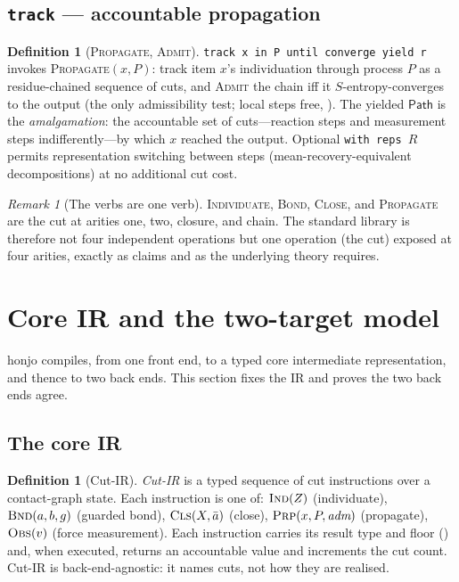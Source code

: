 \documentclass[11pt,a4paper]{article}
\theoremstyle{thmstyle}
\theoremstyle{definition}
\newtheorem{definition}[theorem]{Definition}
\theoremstyle{remark}
\newtheorem{remark}[theorem]{Remark}
\newcommand{\hj}[1]{\texttt{#1}}
\begin{document}
\subsection{\texorpdfstring{\hj{track} --- accountable propagation}{track --- accountable propagation}}
\label{sec:stdlib-track}

\begin{definition}[\textsc{Propagate}, \textsc{Admit}]
\label{def:propagate}
\hj{track\ x\ in\ P\ until\ converge\ yield\ r} invokes
\textsc{Propagate}$(x,P)$: track item $x$'s individuation through process
$P$ as a residue-chained sequence of cuts, and \textsc{Admit} the chain
iff it $S$-entropy-converges to the output (the only admissibility test;
local steps free, ). The yielded $\mathsf{Path}$ is
the \emph{amalgamation}: the accountable set of cuts---reaction steps and
measurement steps indifferently---by which $x$ reached the output.
Optional \hj{with\ reps\ }$R$ permits representation switching between
steps (mean-recovery-equivalent decompositions) at no additional cut cost.
\end{definition}

\begin{remark}[The verbs are one verb]
\label{rem:one-verb}
\textsc{Individuate}, \textsc{Bond}, \textsc{Close}, and
\textsc{Propagate} are the cut at arities one, two, closure, and chain.
The standard library is therefore not four independent operations but one
operation (the cut) exposed at four arities, exactly as
 claims and as the underlying theory requires.
\end{remark}

\section{Core IR and the two-target model}
\label{sec:ir}

honjo compiles, from one front end, to a typed core intermediate
representation, and thence to two back ends. This section fixes the IR and
proves the two back ends agree.

\subsection{The core IR}

\begin{definition}[Cut-IR]
\label{def:ir}
\emph{Cut-IR} is a typed sequence of cut instructions over a contact-graph
state. Each instruction is one of: $\textsc{Ind}(Z)$ (individuate),
$\textsc{Bnd}(a,b,g)$ (guarded bond), $\textsc{Cls}(X,\bar a)$ (close),
$\textsc{Prp}(x,P,\textit{adm})$ (propagate), $\textsc{Obs}(v)$ (force
measurement). Each instruction carries its result type and floor
() and, when executed, returns an accountable value and
increments the cut count. Cut-IR is back-end-agnostic: it names cuts, not
how they are realised.
\end{definition}
\end{document}
